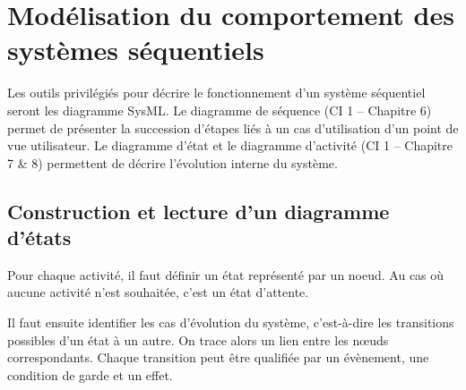 \documentclass[10pt,fleqn]{article} %
\begin{document}
\section{Modélisation du comportement des systèmes séquentiels \cite{pb}}

Les outils privilégiés pour décrire le fonctionnement d'un système séquentiel seront les diagramme SysML. Le diagramme de séquence (CI 1 -- Chapitre 6) permet de présenter la succession d'étapes liés à un cas d'utilisation d'un point de vue utilisateur. Le diagramme d'état et le diagramme d'activité (CI 1 -- Chapitre 7 \& 8) permettent de décrire l'évolution interne du système. 
                           

\subsection{Construction et lecture d'un diagramme d'états}

\begin{methode}
  Pour chaque activité, il faut définir un état représenté par un noeud. Au cas où
aucune activité n’est souhaitée, c’est un état d’attente.

Il faut ensuite identifier les cas d’évolution du système, c'est-à-dire les transitions
possibles d’un état à un autre. On trace alors un lien entre les n\oe{}uds
correspondants. Chaque transition peut être qualifiée par un évènement, une
condition de garde et un effet.
\end{methode}
\end{document}
